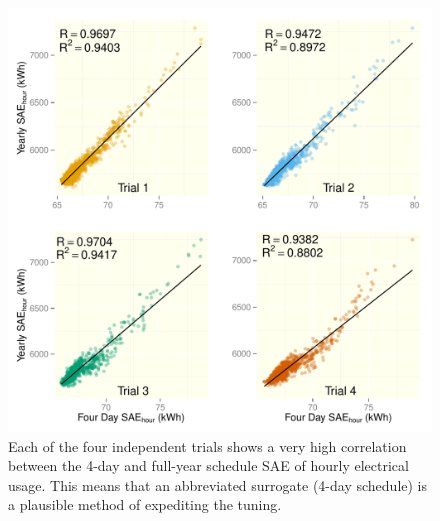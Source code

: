 \documentclass[preprint, review, 12pt]{elsarticle}
\begin{document}
\begin{figure}[htbp]
\centering
\includegraphics[width=5in]{graphics/figure1.pdf}
\caption{Each of the four independent trials shows a very high correlation between the 4-day and full-year schedule SAE of hourly electrical usage. This means that an abbreviated surrogate (4-day schedule) is a plausible method of expediting the tuning.}
\label{fig:hour-corr}
\end{figure}
\end{document}
